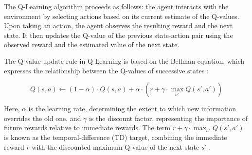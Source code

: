 The Q-Learning algorithm proceeds as follows: the agent interacts with the environment by selecting actions based on its current estimate of the Q-values. Upon taking an action, the agent observes the resulting reward and the next state. It then updates the Q-value of the previous state-action pair using the observed reward and the estimated value of the next state.

The Q-value update rule in Q-Learning is based on the Bellman equation, which expresses the relationship between the Q-values of successive states \cite{russel2020ai}:

\[
Q(s, a) \leftarrow (1 - \alpha) \cdot Q(s, a) + \alpha \cdot \left( r + \gamma \cdot \max_{a'} Q(s', a') \right)
\]

Here, $\alpha$ is the learning rate, determining the extent to which new information overrides the old one, and $\gamma$ is the discount factor, representing the importance of future rewards relative to immediate rewards. The term $r + \gamma \cdot \max_{a'} Q(s', a')$ is known as the temporal-difference (TD) target, combining the immediate reward $r$ with the discounted maximum Q-value of the next state $s'$ \cite{russel2020ai}.




